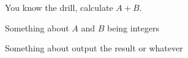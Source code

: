 You know the drill, calculate $A + B$.

\InputFile

Something about $A$ and $B$ being integers 

\OutputFile

Something about output the result or whatever
